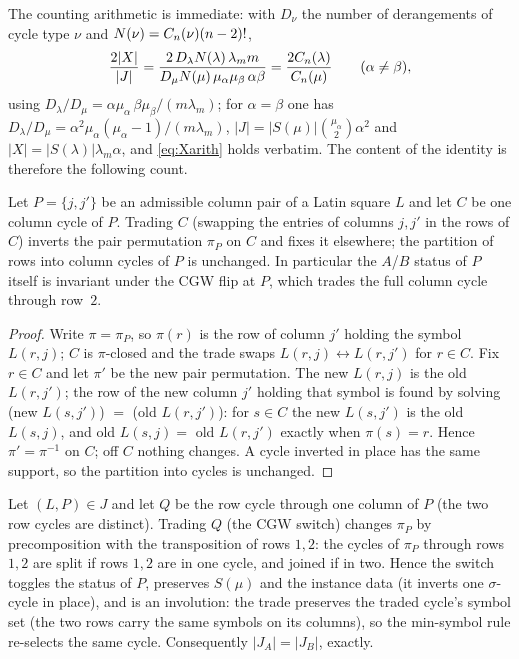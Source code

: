 The counting arithmetic is immediate: with
$D_\nu$ the number of derangements of cycle type $\nu$ and
$N(\nu)=C_n(\nu)(n-2)!$,
\begin{equation}\label{eq:Xarith}
\frac{2|X|}{|J|}
=\frac{2\,D_\lambda N(\lambda)\,\lambda_m m}
       {D_\mu N(\mu)\,\mu_\alpha\mu_\beta\,\alpha\beta}
=\frac{2C_n(\lambda)}{C_n(\mu)}
\qquad(\alpha\neq\beta),
\end{equation}
using $D_\lambda/D_\mu=\alpha\mu_\alpha\,\beta\mu_\beta/(m\lambda_m)$;
for $\alpha=\beta$ one has
$D_\lambda/D_\mu=\alpha^2\mu_\alpha(\mu_\alpha-1)/(m\lambda_m)$,
$|J|=|S(\mu)|\binom{\mu_\alpha}{2}\alpha^2$ and
$|X|=|S(\lambda)|\lambda_m\alpha$, and \eqref{eq:Xarith} holds
verbatim.  The content of the identity is therefore the following
count.

\begin{lemma}\label{lem:cycletrade}
Let $P=\{j,j'\}$ be an admissible column pair of a Latin square $L$ and
let $C$ be one column cycle of $P$.  Trading $C$ (swapping the entries
of columns $j,j'$ in the rows of $C$) inverts the pair permutation
$\pi_P$ on $C$ and fixes it elsewhere; the partition of rows into
column cycles of $P$ is unchanged.  In particular the $A$/$B$ status of
$P$ itself is invariant under the CGW flip at $P$, which trades the
full column cycle through row~$2$.
\end{lemma}

\begin{proof}
Write $\pi=\pi_P$, so $\pi(r)$ is the row of column $j'$ holding the
symbol $L(r,j)$; $C$ is $\pi$-closed and the trade swaps
$L(r,j)\leftrightarrow L(r,j')$ for $r\in C$.  Fix $r\in C$ and let
$\pi'$ be the new pair permutation.  The new $L(r,j)$ is the old
$L(r,j')$; the row of the new column $j'$ holding that symbol is found
by solving (new $L(s,j')$) $=$ (old $L(r,j')$): for $s\in C$ the new
$L(s,j')$ is the old $L(s,j)$, and old $L(s,j)=$ old $L(r,j')$ exactly
when $\pi(s)=r$.  Hence $\pi'=\pi^{-1}$ on $C$; off $C$ nothing
changes.  A cycle inverted in place has the same support, so the
partition into cycles is unchanged.
\end{proof}

\begin{lemma}\label{lem:switchtoggle}
Let $(L,P)\in J$ and let $Q$ be the row cycle through one column of
$P$ (the two row cycles are distinct).  Trading $Q$ (the CGW switch)
changes $\pi_P$ by precomposition with the transposition of rows
$1,2$: the cycles of $\pi_P$ through rows $1,2$ are split if rows
$1,2$ are in one cycle, and joined if in two.  Hence the switch
toggles the status of $P$, preserves $S(\mu)$ and the instance data
(it inverts one $\sigma$-cycle in place), and is an involution:
the trade preserves the traded cycle's symbol set (the two rows carry
the same symbols on its columns), so the min-symbol rule re-selects the
same cycle.  Consequently $|J_A|=|J_B|$, exactly.
\end{lemma}

